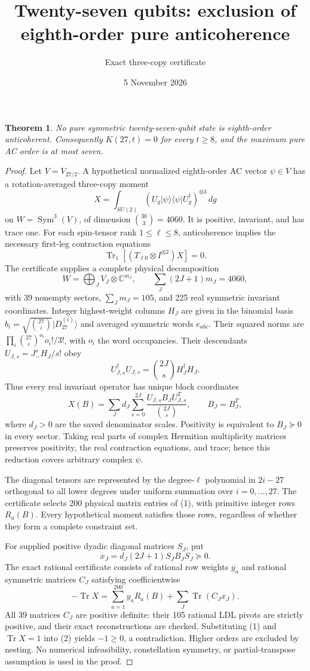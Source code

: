 \documentclass[11pt]{article}
\newtheorem{theorem}{Theorem}
\newcommand{\Tr}{\operatorname{Tr}}
\begin{document}
\title{Twenty-seven qubits: exclusion of eighth-order pure anticoherence}
\author{Exact three-copy certificate}\date{5 November 2026}\maketitle
\begin{theorem}
No pure symmetric twenty-seven-qubit state is eighth-order anticoherent.
Consequently $K(27,t)=0$ for every $t\ge8$, and the maximum pure AC order is at most seven.
\end{theorem}
\begin{proof}
Let $V=V_{27/2}$. A hypothetical normalized eighth-order AC vector $\psi\in V$ has a rotation-averaged three-copy moment
\[
X=\int_{SU(2)}(U_g|\psi\rangle\langle\psi|U_g^\dagger)^{\otimes3}\,dg
\]
on $W=\operatorname{Sym}^3(V)$, of dimension $\binom{30}{3}=4060$.
It is positive, invariant, and has trace one. For each spin-tensor rank $1\le\ell\le8$, anticoherence implies the necessary first-leg contraction equations
\[
\Tr_1[(T_{\ell0}\otimes I^{\otimes2})X]=0. \tag{1}
\]
The certificate supplies a complete physical decomposition
\[
W=\bigoplus_J V_J\otimes\mathbb C^{m_J},\qquad
\sum_J(2J+1)m_J=4060,
\]
with 39 nonempty sectors, $\sum_Jm_J=105$, and 225 real symmetric invariant coordinates. Integer highest-weight columns $H_J$ are given in the binomial basis $b_i=\sqrt{\binom{27}{i}}|D_{27}^{(i)}\rangle$ and averaged symmetric words $e_{abc}$. Their squared norms are $\prod_i\binom{27}{i}^{o_i}o_i!/3!$, with $o_i$ the word occupancies. Their descendants $U_{J,s}=J_-^sH_J/s!$ obey
\[
U_{J,s}^\dagger U_{J,s}=\binom{2J}{s}H_J^\dagger H_J.
\]
Thus every real invariant operator has unique block coordinates
\[
X(B)=\sum_Jd_J\sum_{s=0}^{2J}\frac{U_{J,s}B_JU_{J,s}^T}{\binom{2J}{s}},\qquad B_J=B_J^T,
\]
where $d_J>0$ are the saved denominator scales. Positivity is equivalent to $B_J\succeq0$ in every sector. Taking real parts of complex Hermitian multiplicity matrices preserves positivity, the real contraction equations, and trace; hence this reduction covers arbitrary complex $\psi$.

The diagonal tensors are represented by the degree-$\ell$ polynomial in $2i-27$ orthogonal to all lower degrees under uniform summation over $i=0,\ldots,27$. The certificate selects 200 physical matrix entries of (1), with primitive integer rows $R_a(B)$. Every hypothetical moment satisfies those rows, regardless of whether they form a complete constraint set.

For supplied positive dyadic diagonal matrices $S_J$, put
\[
x_J=d_J(2J+1)S_JB_JS_J\succeq0.
\]
The exact rational certificate consists of rational row weights $y_a$ and rational symmetric matrices $C_J$ satisfying coefficientwise
\[
\boxed{-\Tr X=\sum_{a=1}^{200}y_aR_a(B)+\sum_J\Tr(C_Jx_J).} \tag{2}
\]
All 39 matrices $C_J$ are positive definite: their 105 rational LDL pivots are strictly positive, and their exact reconstructions are checked. Substituting (1) and $\Tr X=1$ into (2) yields $-1\ge0$, a contradiction. Higher orders are excluded by nesting. No numerical infeasibility, constellation symmetry, or partial-transpose assumption is used in the proof.
\end{proof}
\end{document}
